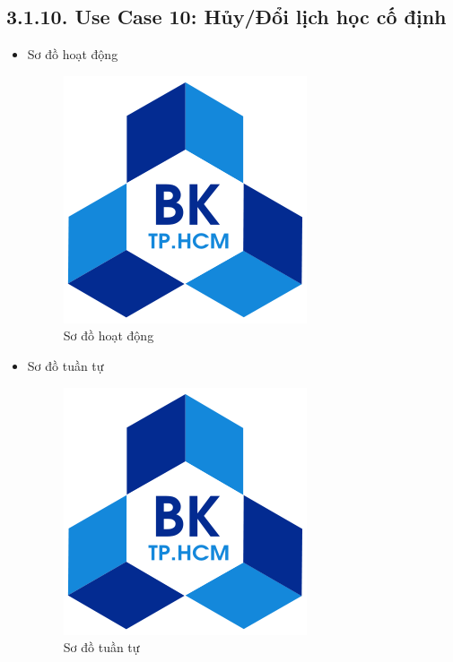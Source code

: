 \subsection*{3.1.10. Use Case 10: Hủy/Đổi lịch học cố định}
\begin{itemize}
    \item Sơ đồ hoạt động
    \begin{figure}[H]
    \centering
    \includegraphics[scale=0.5 ]{Picture/hcmut.png}
    \caption{Sơ đồ hoạt động }
    \end{figure}
    \item Sơ đồ tuần tự
    \begin{figure}[H]
    \centering
    \includegraphics[scale=0.5 ]{Picture/hcmut.png}
    \caption{Sơ đồ tuần tự }
    \end{figure}
\end{itemize}
